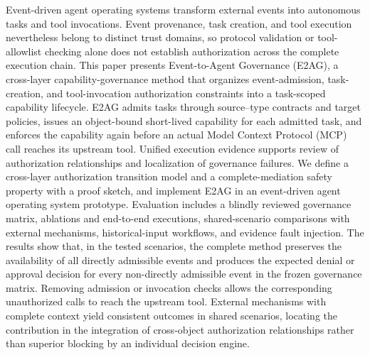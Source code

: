 \begin{josenabstract}
Event-driven agent operating systems transform external events into autonomous tasks and tool invocations. Event provenance, task creation, and tool execution nevertheless belong to distinct trust domains, so protocol validation or tool-allowlist checking alone does not establish authorization across the complete execution chain. This paper presents Event-to-Agent Governance (E2AG), a cross-layer capability-governance method that organizes event-admission, task-creation, and tool-invocation authorization constraints into a task-scoped capability lifecycle. E2AG admits tasks through source--type contracts and target policies, issues an object-bound short-lived capability for each admitted task, and enforces the capability again before an actual Model Context Protocol (MCP) call reaches its upstream tool. Unified execution evidence supports review of authorization relationships and localization of governance failures. We define a cross-layer authorization transition model and a complete-mediation safety property with a proof sketch, and implement E2AG in an event-driven agent operating system prototype. Evaluation includes a blindly reviewed governance matrix, ablations and end-to-end executions, shared-scenario comparisons with external mechanisms, historical-input workflows, and evidence fault injection. The results show that, in the tested scenarios, the complete method preserves the availability of all directly admissible events and produces the expected denial or approval decision for every non-directly admissible event in the frozen governance matrix. Removing admission or invocation checks allows the corresponding unauthorized calls to reach the upstream tool. External mechanisms with complete context yield consistent outcomes in shared scenarios, locating the contribution in the integration of cross-object authorization relationships rather than superior blocking by an individual decision engine.
\end{josenabstract}

\vspace{8pt}
